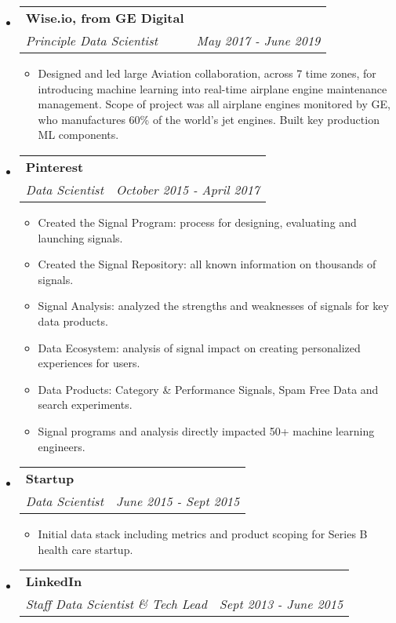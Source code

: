 \documentclass[letterpaper,11pt]{article}
\makeatletter
\newcommand{\resitem}[1]{\item #1 \vspace{-2pt}}
\newcommand{\ressubheading}[4]{

\begin{tabular*}{6.5in}{l@{\cftdotfill{\cftsecdotsep}\extracolsep{\fill}}r}

		\textbf{#1} & #2 \\

		\textit{#3} & \textit{#4} \\

\end{tabular*}\vspace{-6pt}}
\makeatother
\begin{document}
\begin{itemize}

\item 
	\ressubheading{\color{gecolor}Wise.io, from GE Digital}{}{Principle Data Scientist}{May 2017 - June 2019}

	\begin{itemize}
	    \resitem{Designed and led large Aviation collaboration, across 7 time zones, for introducing machine learning into real-time airplane engine maintenance management. Scope of project was all airplane engines monitored by GE, who manufactures 60\% of the world's jet engines. Built key production ML components.}
	\end{itemize}

\item 
	\ressubheading{\color{pinterestcolor}Pinterest}{}{Data Scientist}{October 2015 - April 2017}

	\begin{itemize}
	
		\resitem{Created the Signal Program: process for designing, evaluating and launching signals.}
		
		\resitem{Created the Signal Repository: all known information on thousands of signals.}
		
		\resitem{Signal Analysis: analyzed the strengths and weaknesses of signals for key data products.}
		
		\resitem{Data Ecosystem: analysis of signal impact on creating personalized experiences for users.}

		\resitem{Data Products: Category \& Performance Signals, Spam Free Data and search experiments.}
		
		\resitem{Signal programs and analysis directly impacted 50+ machine learning engineers.}
	\end{itemize}


\item 
	\ressubheading{\color{noomcolor}Startup}{}{Data Scientist}{June 2015 - Sept 2015}

	\begin{itemize}
	
		\resitem{Initial data stack including metrics and product scoping for Series B health care startup.}

	\end{itemize}
	
\item 
	\ressubheading{\color{linkedincolor}LinkedIn}{}{Staff Data Scientist \& Tech Lead}{Sept 2013 - June 2015}


\end{itemize}
\end{document}
